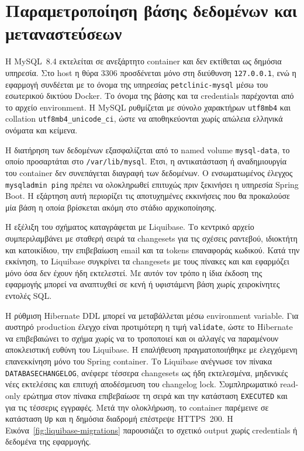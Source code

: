 \section{Παραμετροποίηση βάσης δεδομένων και μεταναστεύσεων}
Η MySQL~8.4 εκτελείται σε ανεξάρτητο container και δεν εκτίθεται ως δημόσια
υπηρεσία. Στο host η θύρα 3306 προσδένεται μόνο στη διεύθυνση
\texttt{127.0.0.1}, ενώ η εφαρμογή συνδέεται με το όνομα της υπηρεσίας
\texttt{petclinic-mysql} μέσω του εσωτερικού δικτύου Docker. Το όνομα της
βάσης και τα credentials παρέχονται από το αρχείο environment. Η MySQL
ρυθμίζεται με σύνολο χαρακτήρων \texttt{utf8mb4} και collation
\texttt{utf8mb4\_unicode\_ci}, ώστε να αποθηκεύονται χωρίς απώλεια ελληνικά
ονόματα και κείμενα.

Η διατήρηση των δεδομένων εξασφαλίζεται από το named volume
\texttt{mysql-data}, το οποίο προσαρτάται στο \texttt{/var/lib/mysql}. Έτσι,
η αντικατάσταση ή αναδημιουργία του container δεν συνεπάγεται διαγραφή των
δεδομένων. Ο ενσωματωμένος έλεγχος \texttt{mysqladmin ping} πρέπει να
ολοκληρωθεί επιτυχώς πριν ξεκινήσει η υπηρεσία Spring Boot. Η εξάρτηση αυτή
περιορίζει τις αποτυχημένες εκκινήσεις που θα προκαλούσε μία βάση η οποία
βρίσκεται ακόμη στο στάδιο αρχικοποίησης.

Η εξέλιξη του σχήματος καταγράφεται με Liquibase. Το κεντρικό αρχείο
 συμπεριλαμβάνει με σταθερή σειρά τα
changesets για τις σχέσεις ραντεβού, ιδιοκτήτη και κατοικίδιου, την
επιβεβαίωση email και τα tokens επαναφοράς κωδικού. Κατά την εκκίνηση, το
Liquibase συγκρίνει τα changesets με τους πίνακες
 και  και εφαρμόζει
μόνο όσα δεν έχουν ήδη εκτελεστεί. Με αυτόν τον τρόπο η ίδια έκδοση της
εφαρμογής μπορεί να αναπτυχθεί σε κενή ή υφιστάμενη βάση χωρίς χειροκίνητες
εντολές SQL.

Η ρύθμιση Hibernate DDL μπορεί να μεταβάλλεται μέσω environment variable.
Για αυστηρό production έλεγχο είναι προτιμότερη η τιμή
\texttt{validate}, ώστε το Hibernate να επιβεβαιώνει το σχήμα χωρίς να το
τροποποιεί και οι αλλαγές να παραμένουν αποκλειστική ευθύνη του Liquibase.
Η επαλήθευση πραγματοποιήθηκε με ελεγχόμενη επανεκκίνηση μόνο του Spring
container. Το Liquibase ανέγνωσε τον πίνακα \texttt{DATABASECHANGELOG},
ανέφερε τέσσερα changesets ως ήδη εκτελεσμένα, μηδενικές νέες εκτελέσεις και
επιτυχή αποδέσμευση του changelog lock. Συμπληρωματικό read-only ερώτημα στον
πίνακα επιβεβαίωσε τη σειρά και την κατάσταση \texttt{EXECUTED} και για τις
τέσσερις εγγραφές. Μετά την ολοκλήρωση, το container παρέμεινε σε κατάσταση
\texttt{Up} και η δημόσια διαδρομή επέστρεψε HTTPS~200. Η
Εικόνα~\ref{fig:liquibase-migrations} παρουσιάζει το σχετικό output χωρίς
credentials ή δεδομένα της εφαρμογής.

